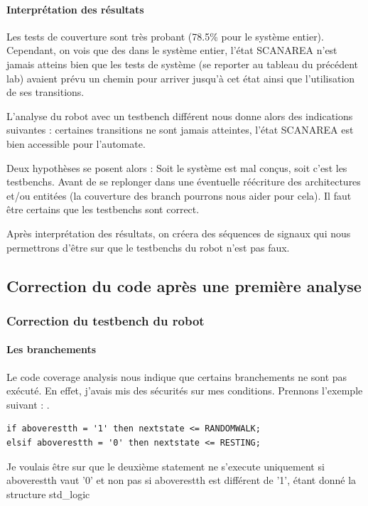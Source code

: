 \documentclass{article}
\newcommand{\sautligne}{
\textbf{\vspace{5mm}}
}
\begin{document}
\paragraph{Interprétation des résultats}
Les tests de couverture sont très probant (78.5\% pour le système entier). Cependant, on vois que des dans le système entier, l'état SCANAREA n'est jamais atteins bien que les tests de système (se reporter au tableau du précédent lab) avaient prévu un chemin pour arriver jusqu'à cet état ainsi que l'utilisation de ses transitions. 

L'analyse du robot avec un testbench différent nous donne alors des indications suivantes : certaines transitions ne sont jamais atteintes, l'état SCANAREA est bien accessible pour l'automate. 
\sautligne

Deux hypothèses se posent alors : Soit le système est mal conçus, soit c'est les testbenchs. Avant de se replonger dans une éventuelle réécriture des architectures et/ou entitées (la couverture des branch pourrons nous aider pour cela). Il faut être certains que les testbenchs sont correct.

Après interprétation des résultats, on créera des séquences de signaux qui nous permettrons d'être sur que le testbenchs du robot n'est pas faux.



\subsection{Correction du code après une première analyse }

\subsubsection{Correction du testbench du robot}

\paragraph{Les branchements}

Le code coverage analysis nous indique que certains branchements ne sont pas exécuté. En effet, j'avais mis des sécurités sur mes conditions. Prennons l'exemple suivant : .

\begin{verbatim}
if aboverestth = '1' then nextstate <= RANDOMWALK;
elsif aboverestth = '0' then nextstate <= RESTING;
\end{verbatim} 

Je voulais être sur que le deuxième statement ne s'execute uniquement si aboverestth vaut '0' et non pas si aboverestth est différent de '1', étant donné la structure std_logic
\end{document}
